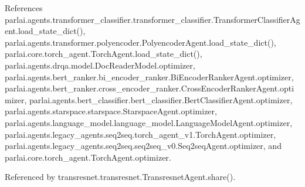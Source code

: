References parlai.\+agents.\+transformer\+\_\+classifier.\+transformer\+\_\+classifier.\+Transformer\+Classifier\+Agent.\+load\+\_\+state\+\_\+dict(), parlai.\+agents.\+transformer.\+polyencoder.\+Polyencoder\+Agent.\+load\+\_\+state\+\_\+dict(), parlai.\+core.\+torch\+\_\+agent.\+Torch\+Agent.\+load\+\_\+state\+\_\+dict(), parlai.\+agents.\+drqa.\+model.\+Doc\+Reader\+Model.\+optimizer, parlai.\+agents.\+bert\+\_\+ranker.\+bi\+\_\+encoder\+\_\+ranker.\+Bi\+Encoder\+Ranker\+Agent.\+optimizer, parlai.\+agents.\+bert\+\_\+ranker.\+cross\+\_\+encoder\+\_\+ranker.\+Cross\+Encoder\+Ranker\+Agent.\+optimizer, parlai.\+agents.\+bert\+\_\+classifier.\+bert\+\_\+classifier.\+Bert\+Classifier\+Agent.\+optimizer, parlai.\+agents.\+starspace.\+starspace.\+Starspace\+Agent.\+optimizer, parlai.\+agents.\+language\+\_\+model.\+language\+\_\+model.\+Language\+Model\+Agent.\+optimizer, parlai.\+agents.\+legacy\+\_\+agents.\+seq2seq.\+torch\+\_\+agent\+\_\+v1.\+Torch\+Agent.\+optimizer, parlai.\+agents.\+legacy\+\_\+agents.\+seq2seq.\+seq2seq\+\_\+v0.\+Seq2seq\+Agent.\+optimizer, and parlai.\+core.\+torch\+\_\+agent.\+Torch\+Agent.\+optimizer.



Referenced by transresnet.\+transresnet.\+Transresnet\+Agent.\+share().

